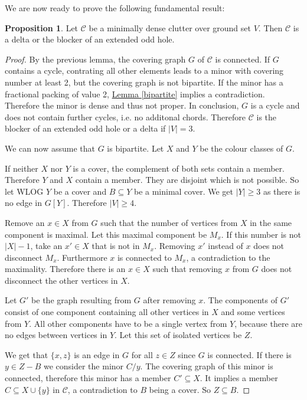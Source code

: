 \documentclass[a4paper, 12pt]{scrbook}
\theoremstyle{definition}
\newtheorem{proposition}[theorem]{Proposition}
\begin{document}
   We are now ready to prove the following fundamental result:

   \begin{proposition}\label{mindense}
       Let $\mathcal{C}$ be a minimally dense clutter over ground set $V$.
       Then $\mathcal{C}$ is a delta or the blocker of an extended odd hole.
   \end{proposition}

   \begin{proof}
       By the previous lemma, the covering graph $G$ of $\mathcal{C}$ is connected.
       If $G$ contains a cycle, contrating all other elements leads to a minor with covering number at least 2, but the covering graph is not bipartite.
       If the minor has a fractional packing of value 2, \hyperref[bipartite]{Lemma \ref*{bipartite}} implies a contradiction. Therefore the minor is dense and thus not proper.
       In conclusion, $G$ is a cycle and does not contain further cycles, i.e. no additonal chords.
       Therefore $\mathcal{C}$ is the blocker of an extended odd hole or a delta if $|V|=3$.

       We can now assume that $G$ is bipartite.
       Let $X$ and $Y$ be the colour classes of $G$.

       If neither $X$ nor $Y$ is a cover, the complement of both sets contain a member. Therefore $Y$ and $X$ contain a member. They are disjoint which is not possible.
       So let WLOG $Y$ be a cover and $B \subseteq Y$ be a minimal cover.
       We get $|Y|\geq 3$ as there is no edge in $G[Y]$.
       Therefore $|V|\geq 4$.

       Remove an $x \in X$ from $G$ such that the number of vertices from $X$ in the same component is maximal.
       Let this maximal component be $M_x$.
       If this number is not $|X|-1$, take an $x' \in X$ that is not in $M_x$.
       Removing $x'$ instead of $x$ does not disconnect $M_x$. Furthermore $x$ is connected to $M_x$, a contradiction to the maximality.
       Therefore there is an $x \in X$ such that removing $x$ from $G$ does not disconnect the other vertices in $X$.

       Let $G'$ be the graph resulting from $G$ after removing $x$.
       The components of $G'$ consist of one component containing all other vertices in $X$ and some vertices from $Y$.
       All other components have to be a single vertex from $Y$, because there are no edges between vertices in $Y$.
       Let this set of isolated vertices be $Z$.

       We get that $\{x,z\}$ is an edge in $G$ for all $z \in Z$ since $G$ is connected.
       If there is $y \in Z-B$ we consider the minor $C / y$.
       The covering graph of this minor is connected, therefore this minor has a member $C' \subseteq X$. It implies a member $C \subseteq X \cup \{y\}$ in $\mathcal{C}$, a contradiction to $B$ being a cover. So $Z \subseteq B$.


\end{proof}
\end{document}
